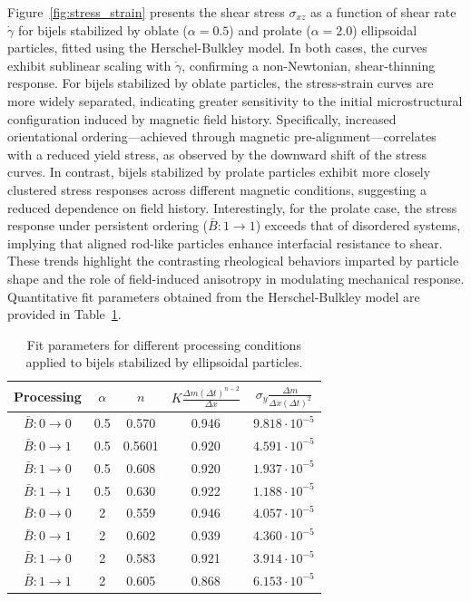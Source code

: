 Figure~\ref{fig:stress_strain} presents the shear stress $\sigma_{xz}$ as a function of shear rate $\dot{\gamma}$ for bijels stabilized by oblate ($\alpha = 0.5$) 
and prolate ($\alpha = 2.0$) ellipsoidal particles, fitted using the Herschel-Bulkley model. In both cases, the curves exhibit sublinear scaling with $\dot{\gamma}$, 
confirming a non-Newtonian, shear-thinning response. For bijels stabilized by oblate particles, the stress-strain curves are more widely separated, indicating 
greater sensitivity to the initial microstructural configuration induced by magnetic field history. Specifically, increased orientational ordering—achieved through 
magnetic pre-alignment—correlates with a reduced yield stress, as observed by the downward shift of the stress curves. In contrast, bijels stabilized by prolate 
particles exhibit more closely clustered stress responses across different magnetic conditions, suggesting a reduced dependence on field history. Interestingly, 
for the prolate case, the stress response under persistent ordering ($\bar{B}:1 \rightarrow 1$) exceeds that of disordered systems, implying that aligned rod-like 
particles enhance interfacial resistance to shear. These trends highlight the contrasting rheological behaviors imparted by particle shape and the role of 
field-induced anisotropy in modulating mechanical response. Quantitative fit parameters obtained from the Herschel-Bulkley model are provided in 
Table~\ref{table:rheology_fit}.

\begin{table}[h!]
    \centering
    \renewcommand{\arraystretch}{1.5}  %
    \begin{tabular}{||c c c c c||} 
     \hline
     Processing & $\alpha$ & $n$ & $K \frac{\Delta m (\Delta t)^{n-2}}{\Delta x} $ & $\sigma_{y} \frac{\Delta m}{\Delta x (\Delta t)^2}$ \\ [0.5ex] 
     \hline\hline
     $\bar{B}: 0 \rightarrow 0$ & 0.5 & 0.570 & 0.946 & $9.818 \cdot 10^{-5}$ \\ 
     \hline
     $\bar{B}: 0 \rightarrow 1$ & 0.5 & 0.5601 & 0.920 & $4.591 \cdot 10^{-5}$ \\
     \hline
     $\bar{B}: 1 \rightarrow 0$ & 0.5 & 0.608 & 0.920 & $1.937 \cdot 10^{-5}$ \\
     \hline
     $\bar{B}: 1 \rightarrow 1$ & 0.5 & 0.630 & 0.922 & $1.188 \cdot 10^{-5}$ \\
     \hline
     $\bar{B}: 0 \rightarrow 0$ & 2 & 0.559 & 0.946 & $4.057 \cdot 10^{-5}$ \\
     \hline
     $\bar{B}: 0 \rightarrow 1$ & 2 & 0.602 & 0.939 & $4.360 \cdot 10^{-5}$ \\
     \hline
     $\bar{B}: 1 \rightarrow 0$ & 2 & 0.583 & 0.921 & $3.914 \cdot 10^{-5}$ \\
     \hline
     $\bar{B}: 1 \rightarrow 1$ & 2 & 0.605 & 0.868 & $6.153 \cdot 10^{-5}$ \\ [1ex] 
     \hline
    \end{tabular}
    \caption{Fit parameters for different processing conditions applied to bijels stabilized by ellipsoidal particles.}
    \label{table:rheology_fit}
\end{table}
 

